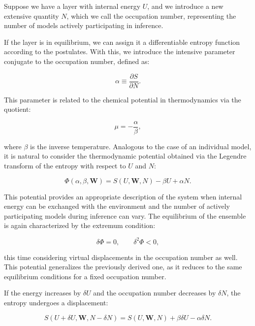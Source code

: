 \documentclass[12pt]{article}
\begin{document}
Suppose we have a layer with internal energy $U$, and we introduce a new extensive quantity $N$, which we call the occupation number, representing the number of models actively participating in inference.

If the layer is in equilibrium, we can assign it a differentiable entropy function according to the postulates. With this, we introduce the intensive parameter conjugate to the occupation number, defined as:

\begin{equation}
\alpha \equiv \frac{\partial S}{\partial N}.
\end{equation}

This parameter is related to the chemical potential in thermodynamics via the quotient:

\begin{equation}
\mu = -\frac{\alpha}{\beta},
\end{equation}

where $\beta$ is the inverse temperature. Analogous to the case of an individual model, it is natural to consider the thermodynamic potential obtained via the Legendre transform of the entropy with respect to $U$ and $N$:

\begin{equation}
\Phi(\alpha, \beta, \mathbf{W}) = S(U, \mathbf{W}, N) - \beta U + \alpha N.
\end{equation}

This potential provides an appropriate description of the system when internal energy can be exchanged with the environment and the number of actively participating models during inference can vary. The equilibrium of the ensemble is again characterized by the extremum condition:

\begin{equation}
\delta \Phi = 0, \qquad \delta^2 \Phi < 0,
\end{equation}

this time considering virtual displacements in the occupation number as well. This potential generalizes the previously derived one, as it reduces to the same equilibrium conditions for a fixed occupation number.

If the energy increases by $\delta U$ and the occupation number decreases by $\delta N$, the entropy undergoes a displacement:

\begin{equation}
S(U+\delta U, \mathbf{W}, N- \delta N) = S(U, \mathbf{W},N) +\beta \delta U - \alpha \delta N.
\end{equation}
\end{document}
